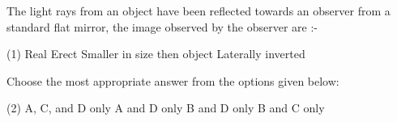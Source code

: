 \item The light rays from an object have been reflected towards an observer from a standard flat mirror, the image observed by the observer are :-
    \begin{tasks}(1)
        \task Real
        \task Erect
        \task Smaller in size then object
        \task Laterally inverted
    \end{tasks}
Choose the most appropriate answer from the options given below:
    \begin{tasks}(2)
        \task A, C, and D only
        \task A and D only
        \task B and D only
        \task B and C only
    \end{tasks}